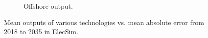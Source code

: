 \documentclass[final,3p,times,twocolumn,numbers]{elsarticle}
\begin{document}
\begin{figure}
\begin{subfigure}[b]{0.475\textwidth}
\caption{Offshore output.}
\label{fig:contributed_Offshore_mean_output.eps}
\end{subfigure}
\label{fig:pv_coal_nuclear_offshore_outputs}
\caption{Mean outputs of various technologies vs. mean absolute error from 2018 to 2035 in ElecSim.}
\end{figure}
    
    
    
%
%
%
%
%
%



\end{document}
